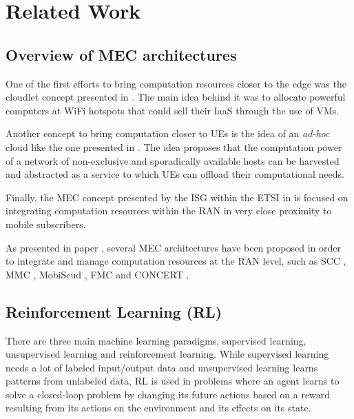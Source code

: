 \documentclass[conference]{IEEEtran}
\begin{document}
\section{Related Work}

\subsection{Overview of \acrshort{MEC} architectures} \label{section:MECarch}

\noindent One of the first efforts to bring computation resources closer to the edge was the cloudlet concept presented in \cite{cloudlet}. The main idea behind it was to allocate powerful computers at WiFi hotspots that could sell their \acrfull{IaaS} through the use of \acrfull{VMs}.

Another concept to bring computation closer to \acrshort{UE}s is the idea of an \emph{ad-hoc} cloud like the one presented in \cite{adhoc}. The idea proposes that the computation power of a network of non-exclusive and sporadically available hosts can be harvested and abstracted as a service to which \acrshort{UE}s can offload their computational needs.

Finally, the \acrfull{MEC} concept presented by the \acrfull{ISG} within the \acrfull{ETSI} in \cite{MECspec} is focused on integrating computation resources within the \acrfull{RAN} in very close proximity to mobile subscribers.

As presented in paper \cite{SHAKARAMI2020107496}, several \acrshort{MEC} architectures have been proposed in order to integrate and manage computation resources at the \acrshort{RAN} level, such as \acrfull{SCC} \cite{smallcellcloud}, \acrfull{MMC} \cite{mmcloud}, \acrfull{MobiScud} \cite{MobiScud}, \acrfull{FMC} \cite{fmcloud} and CONCERT \cite{CONCERT}.

\subsection{Reinforcement Learning (RL)} \label{section:RL}
\noindent There are three main machine learning paradigms, supervised learning, unsupervised learning and reinforcement learning. While supervised learning needs a lot of labeled input/output data and unsupervised learning learns patterns from unlabeled data, \acrfull{RL} is used in problems where an agent learns to solve a closed-loop problem by changing its future actions based on a reward resulting from its actions on the environment and its effects on its state.
\end{document}
